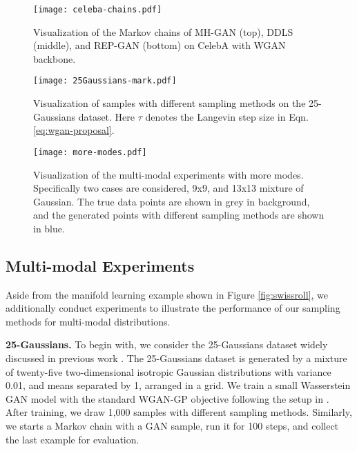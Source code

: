 \documentclass{article} %
\newcommand{\<}{\left\langle}
\renewcommand{\>}{\right\rangle}
\begin{document}
\begin{figure}[t]
    \centering
    \texttt{[image: celeba-chains.pdf]}
    \caption{Visualization of the Markov chains of MH-GAN (top), DDLS (middle), and REP-GAN (bottom) on CelebA with WGAN backbone.}
    \label{fig:celeba-chains}
\end{figure}


\begin{figure}[h]
    \centering
    \texttt{[image: 25Gaussians-mark.pdf]}
    \caption{Visualization of samples with different sampling methods on the 25-Gaussians dataset. Here $\tau$ denotes the Langevin step size in Eqn. \eqref{eq:wgan-proposal}.}
    \label{fig:25gaussians}
\end{figure}

\begin{figure}[h]
    \centering
    \texttt{[image: more-modes.pdf]}
    \caption{Visualization of the multi-modal experiments with more modes. Specifically two cases are considered, 9x9, and 13x13 mixture of Gaussian. The true data points are shown in grey in background, and the generated points with different sampling methods are shown in blue. }
    \label{fig:more-modes}
\end{figure}



\subsection{Multi-modal Experiments}

Aside from the manifold learning example shown in Figure \ref{fig:swissroll}, we additionally conduct experiments to illustrate the performance of our sampling methods for multi-modal distributions.

\textbf{25-Gaussians.} To begin with, we consider the 25-Gaussians dataset widely discussed in previous work \citep{azadi2019discriminator,turner2019metropolis,che2020your}. The 25-Gaussians dataset is generated by a mixture of twenty-five two-dimensional isotropic Gaussian distributions with variance 0.01, and means separated by 1, arranged in a grid. We train a small Wasserstein GAN model with the standard WGAN-GP objective following the setup in  \cite{tanaka2019discriminator}. After training, we draw 1,000 samples with different sampling methods. Similarly, we starts a Markov chain with a GAN sample, run it for 100 steps, and collect the last example for evaluation.
\end{document}
